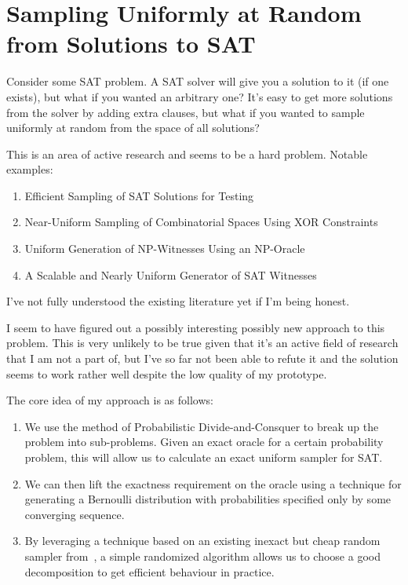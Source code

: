 \chapter{Sampling Uniformly at Random from Solutions to SAT}

Consider some SAT problem.
A SAT solver will give you a solution to it (if one exists),
but what if you wanted an arbitrary one?
It's easy to get more solutions from the solver by adding extra clauses,
but what if you wanted to sample uniformly at random from the space of all
solutions?

This is an area of active research and seems to be a hard problem.
Notable examples:

\begin{enumerate}
\item Efficient Sampling of SAT Solutions for Testing\cite{dutra2018efficient}
\item Near-Uniform Sampling of Combinatorial Spaces Using XOR Constraints\cite{DBLP:conf/nips/GomesSS06}
\item Uniform Generation of NP-Witnesses Using an NP-Oracle\cite{DBLP:journals/iandc/BellareGP00}
\item A Scalable and Nearly Uniform Generator of SAT Witnesses\cite{DBLP:conf/cav/ChakrabortyMV13}
\end{enumerate}

I've not fully understood the existing literature yet if I'm being honest.

I seem to have figured out a possibly interesting possibly new approach to this problem.
This is very unlikely to be true given that it's an active field of research that I am not a part of,
but I've so far not been able to refute it and the solution seems to work rather well despite the low quality of my prototype.

The core idea of my approach is as follows:

\begin{enumerate}
\item We use the method of Probabilistic Divide-and-Consquer\cite{DBLP:journals/cpc/ArratiaD16} to break up the problem into sub-problems.
Given an exact oracle for a certain probability problem,
this will allow us to calculate an exact uniform sampler for SAT.
\item We can then lift the exactness requirement on the oracle using a technique for generating a Bernoulli distribution with probabilities specified only by some converging sequence.
\item By leveraging a technique based on an existing inexact but cheap random sampler from~\cite{DBLP:conf/nips/GomesSS06},
a simple randomized algorithm allows us to choose a good decomposition to get efficient behaviour in practice.
\end{enumerate}

